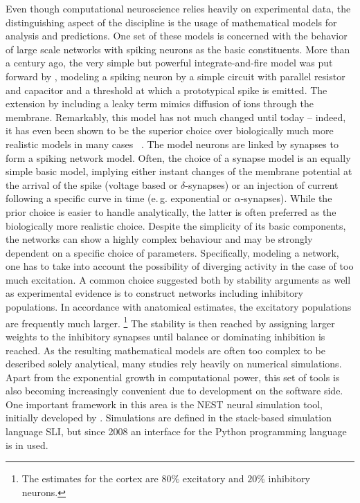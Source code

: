 Even though computational neuroscience relies heavily on experimental data, the distinguishing 
aspect of the discipline is the usage of mathematical models for analysis and predictions. 
One set of these models is concerned with the behavior of large scale networks with spiking 
neurons as the basic constituents. More than a century ago, the very simple but powerful
integrate-and-fire model was put forward by , 
modeling a spiking neuron by a simple circuit 
with parallel resistor and capacitor and a threshold at which a prototypical spike 
is emitted. The extension by including a leaky term 
mimics diffusion of ions through the membrane.
Remarkably, this model has not much changed until today -- indeed, it has even been shown 
to be the superior choice over biologically much more realistic models in many cases%
~\cite{brette2015most}.
The model neurons are linked by synapses to form a spiking network model. Often, the choice 
of a synapse model is an equally simple basic model, implying either instant changes 
of the membrane potential at the arrival of the spike (voltage based or $\delta$-synapses) or an
injection of current following a specific curve in time (e.\,g. exponential or $\alpha$-synapses). 
While the prior choice is easier to handle analytically, the latter is often preferred as the 
biologically more realistic choice. 
Despite the simplicity of its basic components, the networks can show a highly complex behaviour
and may be strongly dependent on a specific choice of parameters. 
Specifically, modeling a network, one has to take into account the possibility of 
diverging activity in the case of too much excitation. A common choice suggested both 
by stability arguments as well as experimental evidence is to construct networks 
including inhibitory populations. In accordance with anatomical estimates, 
the excitatory populations are frequently much larger.%
\footnote{
    The estimates for the cortex are $80 \%$ excitatory and $20 \%$ inhibitory neurons.\cite{brunel2000}
}
The stability is then reached 
by assigning larger weights to the inhibitory synapses until balance or dominating inhibition
is reached. 
As the resulting mathematical models are often too complex to be described 
solely analytical, many studies rely heavily on numerical simulations. 
Apart from the exponential growth in computational power, this set of tools is 
also becoming increasingly convenient due to development on the software side. 
One important framework in this area is the NEST neural simulation tool, initially developed
by . Simulations are defined in the stack-based simulation 
language SLI, but since 2008 an interface for the Python programming language~%
\cite{python} is in used.

